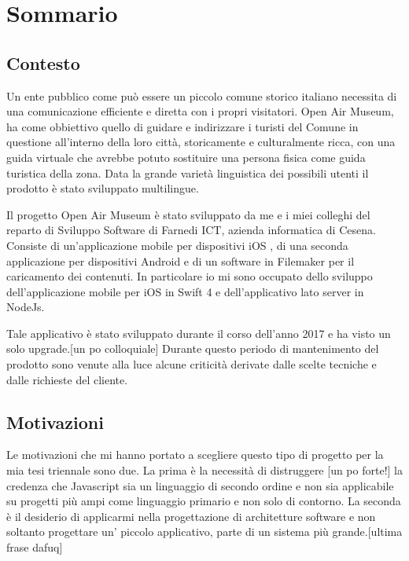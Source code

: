 \chapter*{Sommario} %
\label{sommario}

\vspace{5mm}

\section{Contesto}\vspace{5mm}

Un ente pubblico come può essere un piccolo comune storico italiano necessita di una comunicazione efficiente e diretta con i propri visitatori. Open Air Museum, ha come obbiettivo quello di guidare e indirizzare i turisti del Comune in questione all’interno della loro città, storicamente e culturalmente ricca, con una guida virtuale che avrebbe potuto sostituire una persona fisica come guida turistica della zona. Data la grande varietà linguistica dei possibili utenti il prodotto è stato sviluppato multilingue.\vspace{5mm}

Il progetto Open Air Museum è stato sviluppato da me e i miei colleghi del reparto di Sviluppo Software di Farnedi ICT\cite{FICT}, azienda informatica di Cesena. Consiste di un’applicazione mobile per dispositivi iOS\cite{IOS} , di una seconda applicazione per dispositivi Android\cite{ANDROID} e di un software in Filemaker\cite{FileMaker} per il caricamento dei contenuti. In particolare io mi sono occupato dello sviluppo dell’applicazione mobile per iOS\cite{IOS} in Swift 4\cite{Swift} e dell’applicativo lato server in NodeJs\cite{Nodejs}.\vspace{5mm}

Tale applicativo è stato sviluppato durante il corso dell'anno 2017 e ha visto un solo upgrade.[un po colloquiale] Durante questo periodo di mantenimento del prodotto sono venute alla luce alcune criticità derivate dalle scelte tecniche e dalle richieste del cliente.

\section{Motivazioni}\vspace{5mm}

Le motivazioni che mi hanno portato a scegliere questo tipo di progetto per la mia tesi triennale sono due. La prima è la necessità di distruggere [un po forte!] la credenza che Javascript\cite{JS} sia un linguaggio di secondo ordine e non sia applicabile su progetti più ampi come linguaggio primario e non solo di contorno. La seconda è il desiderio di applicarmi nella progettazione di architetture software e non soltanto progettare un' piccolo applicativo, parte di un sistema più grande.[ultima frase dafuq]

